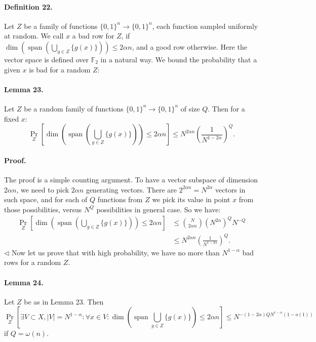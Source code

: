 \documentclass[10pt,a4paper]{article}
\begin{document}
\paragraph{Definition 22.} Let $Z$ be a family of functions $\{0,1\}^n\to\{0,1\}^n$, each function sampled uniformly at random. We call $x$ a bad row for $Z$, if $\dim(\operatorname{span}(\bigcup_{g\in Z}\{g(x)\}))\leq2\alpha n$, and a good row otherwise. Here the vector space is defined over $\mathbb F_2$ in a natural way.
We bound the probability that a given $x$ is bad for a random $Z$:
\paragraph{Lemma 23.} Let $Z$ be a random family of functions $\{0,1\}^n\to\{0,1\}^n$ of size $Q$. Then for a fixed $x$:
\[\Pr_Z\left[\dim\left(\operatorname{span}\left(\bigcup_{g\in Z}\{g(x)\}\right)\right)\leq2\alpha n\right]\leq N^{2\alpha n}\left(\frac1{N^{1-2\alpha}}\right)^Q.\]
\paragraph{Proof.} The proof is a simple counting argument. To have a vector subspace of dimension $2\alpha n$, we need to pick $2\alpha n$ generating vectors. There are $2^{2\alpha n}=N^{2\alpha}$ vectors in such space, and for each of $Q$ functions from $Z$ we pick its value in point $x$ from those possibilities, versus $N^Q$ possibilities in general case. So we have:
\begin{align*}
\Pr_Z\left[\dim\left(\operatorname{span}\left(\bigcup_{g\in Z}\{g(x)\}\right)\right)\leq2\alpha n\right]
&\leq\binom N{2\alpha n}(N^{2\alpha})^QN^{-Q}\\
&\leq N^{2\alpha n}\left(\frac1{N^{1-2\alpha}}\right)^Q.
\end{align*}\hfill$\triangleleft$
Now let us prove that with high probability, we have no more than $N^{1-\alpha}$ bad rows for a random $Z$.
\paragraph{Lemma 24.} Let $Z$ be as in Lemma 23. Then
\[\Pr_Z\left[\exists V\subset X,|V|=N^{1-\alpha}:\forall x\in V:\dim\left(\operatorname{span}\bigcup_{g\in Z}\{g(x)\}\right)\leq2\alpha n\right]\leq N^{-(1-2\alpha)QN^{1-\alpha}(1-o(1))}\]
if $Q=\omega(n)$.
\end{document}

